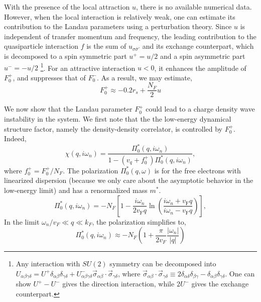 \documentclass[reprint,amsmath,amssymb,aps,prb]{revtex4-1}
\begin{document}
With the presence of the local attraction $u$, there is no available numerical data. However, when the local interaction is relatively weak, one can estimate its contribution to the Landau parameters using a perturbation theory. Since $u$ is independent of transfer momentum and frequency, the leading contribution to the quasiparticle interaction $f$ is the sum of $u_{\sigma\bar{\sigma}'}$ and its exchange counterpart, which is decomposed to a spin symmetric part $u^+=u/2$ and a spin asymmetric part $u^-=-u/2$ \footnote{Any interaction with $SU(2)$ symmetry can be decomposed into $U_{\alpha\beta\gamma\delta}=U^+\delta_{\alpha\beta}\delta_{\gamma\delta}+U^-_{\alpha\beta\gamma\delta}\vec{\sigma}_{\alpha\beta}\cdot\vec{\sigma}_{\gamma\delta}$, where $\vec{\sigma}_{\alpha \beta} \cdot \vec{\sigma}_{\gamma \delta} \equiv 2 \delta_{\alpha \delta} \delta_{\beta \gamma}-\delta_{\alpha \beta} \delta_{\gamma \delta}$. One can show $U^+-U^-$ gives the direction interaction, while $2U^-$ gives the exchange counterpart.}. For an attractive interaction $u<0$, it enhances the amplitude of $F_0^+$, and suppresses that of $F_0^-$. As a result, we may estimate,
\begin{equation}
    \label{eq:f}
    F_0^+\approx -0.2r_s + \frac{N_F}{2}u
\end{equation}

We now show that the Landau parameter $F_0^+$ could lead to a charge density wave instability in the system. We first note that the the low-energy dynamical structure factor, namely the density-density correlator, is controlled by $F_0^+$. Indeed,
\begin{equation}
    \label{eq:chi}
    \chi(q, i\omega_n) = \frac{\Pi^*_0(q, i\omega_n)}{1-(v_q+f_0^+)\Pi^*_0(q, i\omega_n)},
\end{equation}
where $f_0^+=F_0^+/N_F$. The polarization $\Pi^*_0(q,\omega)$ is for the free electrons with linearized dispersion (because we only care about the asymptotic behavior in the low-energy limit) and has a renormalized mass $m^*$.
\begin{equation}
    \Pi^*_0(q, i\omega_n)=-N_F\left[1-\frac{i \omega_{n}}{2 v_{\mathrm{F}} q} \ln \left(\frac{i \omega_{n}+v_{\mathrm{F}} q}{i \omega_{n}-v_{\mathrm{F}} q}\right)\right],
\end{equation}
In the limit $\omega_n/v_F \ll q \ll k_F$, the polarization simplifies to,
\begin{equation}
    \Pi^*_0(q, i\omega_n) \approx -N_F\left( 1 +\frac{\pi}{2 v_F} \frac{|\omega_n|}{|q|}\right)
\end{equation}
\end{document}
